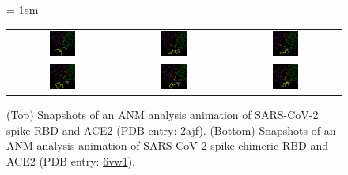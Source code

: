 \begin{figure}[h]
	\centering
	\tabcolsep = 1em
	\mySfFamily
	\begin{tabular}{c c c}
		\includegraphics[width = 0.25\textwidth]{../images/2ajf_animation1_cropped.png} & \includegraphics[width = 0.25\textwidth]{../images/2ajf_animation2_cropped.png} & \includegraphics[width = 0.25\textwidth]{../images/2ajf_animation3_cropped.png} \\[3ex]
		\includegraphics[width = 0.25\textwidth]{../images/6vw1_animation1_cropped.png} & \includegraphics[width = 0.25\textwidth]{../images/6vw1_animation2_cropped.png} & \includegraphics[width = 0.25\textwidth]{../images/6vw1_animation3_cropped.png}
	\end{tabular}
	\caption{(Top) Snapshots of an ANM analysis animation of SARS-CoV-2 spike RBD and ACE2 (PDB entry: \href{https://www.rcsb.org/structure/2ajf}{2ajf}). (Bottom) Snapshots of an ANM analysis animation of SARS-CoV-2 spike chimeric RBD and ACE2 (PDB entry: \href{https://www.rcsb.org/structure/6vw1}{6vw1}).}
	\label{fig:coronavirus_anm_animation}
\end{figure}

